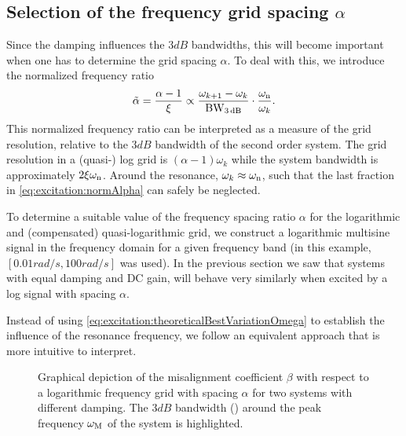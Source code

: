   \subsection{Selection of the frequency grid spacing $\alpha$}
  Since the damping influences the $3\unit{dB}$ bandwidths, this will become important when one has to determine the grid spacing $\alpha$.
  To deal with this, we introduce the normalized frequency ratio
  \begin{equation}
    \tilde{\alpha} = \frac{\alpha - 1}
                          {\xi_{}}
                   \propto \frac{\omega_{k+1} - \omega_k}
                                {\mathrm{BW}_{3\,\mathrm{dB}}}
                           \cdot
                           \frac{\omega_{\mathrm{n}}}{\omega_k}
    \text{.}
    \label{eq:excitation:normAlpha} 
  \end{equation}
  This normalized frequency ratio can be interpreted as a measure of the grid resolution, relative to the $3\unit{dB}$ bandwidth of the second order system.
  The grid resolution in a (quasi-) log grid is $\left( \alpha - 1\right)\omega_k$ while the system bandwidth is approximately $2\xi_{}\omega_{\mathrm{n}}$.
  Around the resonance, $\omega_k \approx \omega_{\mathrm{n}}$, such that the last fraction in \eqref{eq:excitation:normAlpha} can safely be neglected.
  
  To determine a suitable value of the frequency spacing ratio $\alpha$ for the logarithmic and (compensated) quasi-logarithmic grid, we construct a logarithmic multisine signal in the frequency domain for a given frequency band (in this example, $\left[ 0.01 \unit{rad/s}, 100 \unit{rad/s}\right]$ was used).
  In the previous section we saw that systems with equal damping and \gls{DC} gain, will behave very similarly when excited by a log signal with spacing $\alpha$.

  Instead of using \eqref{eq:excitation:theoreticalBestVariationOmega} to establish the influence of the resonance frequency, we follow an equivalent approach that is more intuitive to interpret.

  \begin{figure}
    \centering
      \setlength{}
      \setlength\figureheight{0.5\figurewidth}
    
    \caption[Depiction of the grid misalignment $\beta$ for a logarithmic generalized multisine.]{Graphical depiction of the misalignment coefficient $\beta$ with respect to a logarithmic frequency grid with spacing $\alpha$ for two systems with different damping.
    The $3\unit{dB}$ bandwidth (\sysBW) around the peak frequency $\omega_{\mathrm{M}}$ of the system is highlighted.}
    \label{fig:excitation:misalignment-logms}
  \end{figure}


